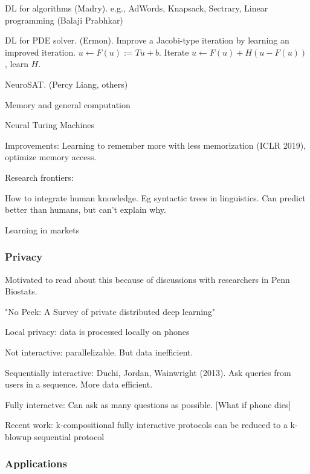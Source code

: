 \documentclass[english]{article}
\begin{document}
DL for algorithms (Madry). e.g., AdWords, Knapsack, Sectrary, Linear programming (Balaji Prabhkar)

DL for PDE solver. (Ermon). Improve a Jacobi-type iteration by learning an improved iteration. $u\gets  F(u):=Tu+b$. Iterate $u\gets  F(u) + H(u-F(u))$, learn $H$.

NeuroSAT. (Percy Liang, others)

\item Memory and general computation

Neural Turing Machines

Improvements: Learning to remember more with less memorization (ICLR 2019), optimize memory access.


\item Research frontiers: 

How to integrate human knowledge. Eg syntactic trees in linguistics. Can predict better than humans, but can't explain why. 

\item Learning in markets
\eenum 


\subsubsection{Privacy}


\benum 
\item Motivated to read about this because of discussions with researchers in Penn Biostats.

\item "No Peek: A Survey of private distributed deep
learning"

\item Local privacy: data is processed locally on phones

Not interactive:  parallelizable. But data inefficient.

Sequentially interactive: Duchi, Jordan, Wainwright (2013). Ask queries from users in a sequence. More data efficient.

Fully interactve: Can ask as many questions as possible. [What if phone dies]

Recent work: k-compositional fully interactive protocols can be reduced to a k-blowup sequential protocol


\eenum







\subsubsection{Applications}
\end{document}

